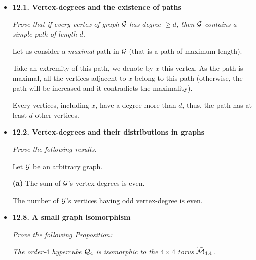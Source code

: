 \begin{itemize}
\item
{\bf 12.1. Vertex-degrees and the existence of paths}
\smallskip

{\em Prove that if every vertex of graph $\mbox{$\cal G$}$ has degree $\geq d$, then $\mbox{$\cal G$}$ contains a {\em simple} path of length $d$.}
\smallskip

Let us consider a \textit{maximal} path in $\mbox{$\cal G$}$ (that is a path of maximum length). 

Take an extremity of this path, we denote by $x$ this vertex.
As the path is maximal, all the vertices adjacent to $x$ belong to this path (otherwise, the path will be increased
and it contradicts the maximality).

Every vertices, including $x$, have a degree more than $d$, thus, the path has at least $d$ other vertices.

\medskip\item
{\bf 12.2. Vertex-degrees and their distributions in graphs}
\smallskip

{\em Prove the following results.}

\begin{prop}
Let $\mbox{$\cal G$}$ be an arbitrary graph.
\smallskip

\noindent
{\bf (a)} The sum of $\mbox{$\cal G$}$'s vertex-degrees is even.
\smallskip

The number of $\mbox{$\cal G$}$'s vertices having odd vertex-degree is even.
\end{prop}

\medskip\item
{\bf 12.8. A small graph isomorphism}
\smallskip

{\em Prove the following Proposition:}
\smallskip

{\em The order-$4$ hypercube $\mbox{$\cal Q$}_4$ is \textit{isomorphic} to the $4 \times 4$ torus $\widetilde{\mbox{$\cal M$}}_{4,4}$.}
\smallskip

%


\end{itemize}
